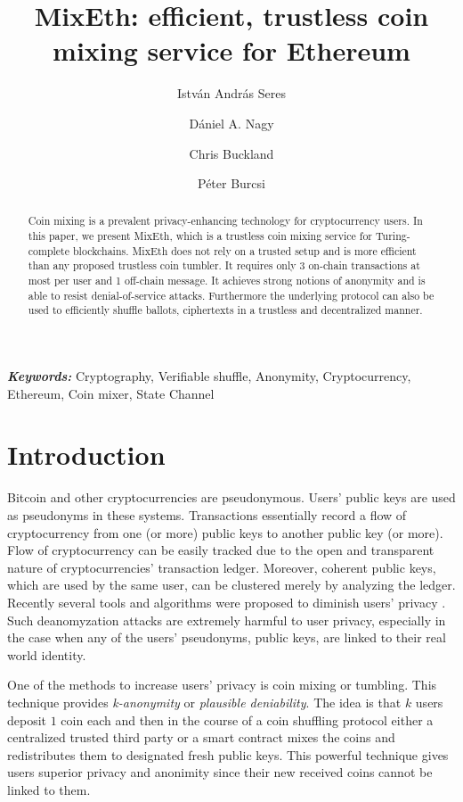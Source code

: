 \documentclass[a4paper]{article}
\date{}
\title{MixEth: efficient, trustless coin mixing service for Ethereum}
\author[1]{István András Seres}
\author[1]{Dániel A. Nagy}
\author[2]{Chris Buckland}
\author[1]{Péter Burcsi}
\affil[1]{Department of Computer Algebra, Eötvös Loránd University}
\affil[2]{King's College London}
\theoremstyle{definition}
\providecommand{\keywords}[1]{\textbf{\textit{Keywords:}} #1}
\begin{document}
\maketitle

\begin{abstract}
Coin mixing is a prevalent privacy-enhancing technology for cryptocurrency users. In this paper, we present MixEth, which is a trustless coin mixing service for Turing-complete blockchains. MixEth does not rely on a trusted setup and is more efficient than any proposed trustless coin tumbler. It requires only 3 on-chain transactions at most per user and 1 off-chain message. It achieves strong notions of anonymity and is able to resist denial-of-service attacks. Furthermore the underlying protocol can also be used to efficiently shuffle ballots, ciphertexts in a trustless and decentralized manner.     
\end{abstract}
\keywords{Cryptography, Verifiable shuffle, Anonymity, Cryptocurrency, Ethereum, Coin mixer, State Channel}

\section{Introduction}
Bitcoin \cite{nakamoto2008bitcoin} and other cryptocurrencies are pseudonymous. Users' public keys are used as pseudonyms in these systems. Transactions essentially record a flow of cryptocurrency from one (or more) public keys to another public key (or more). Flow of cryptocurrency can be easily tracked due to the open and transparent nature of cryptocurrencies' transaction ledger. Moreover, coherent public keys, which are used by the same user, can be clustered merely by analyzing the ledger. Recently several tools and algorithms were proposed to diminish users' privacy \cite{meiklejohn2013fistful,moser2013inquiry,moreno2016listening}. Such deanomyzation attacks are extremely harmful to user privacy, especially in the case when any of the users' pseudonyms, public keys, are linked to their real world identity. 

One of the methods to increase users' privacy is coin mixing or tumbling. This technique provides \textit{k-anonymity} or \textit{plausible deniability}. The idea is that $k$ users deposit $1$ coin each and then in the course of a coin shuffling protocol either a centralized trusted third party or a smart contract mixes the coins and redistributes them to designated fresh public keys. This powerful technique gives users superior privacy and anonimity since their new received coins cannot be linked to them.
\end{document}
